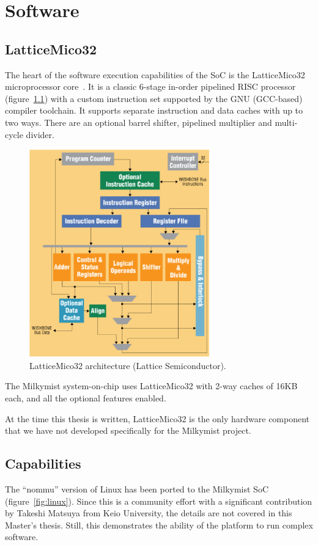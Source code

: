 \documentclass[a4paper,11pt]{kthesis}
\begin{document}
\chapter{Software}
\label{ch:sw}
\section{LatticeMico32}
\label{sec:mico32}
The heart of the software execution capabilities of the SoC is the LatticeMico32 microprocessor core~\cite{mico32}. It is a classic 6-stage in-order pipelined RISC processor (figure~\ref{fig:lm32arch}) with a custom instruction set supported by the GNU (GCC-based) compiler toolchain. It supports separate instruction and data caches with up to two ways. There are an optional barrel shifter, pipelined multiplier and multi-cycle divider.

\begin{figure}[htp]
\centering
\includegraphics[height=90mm]{lm32arch.eps}
\caption{LatticeMico32 architecture (Lattice Semiconductor).}
\label{fig:lm32arch}
\end{figure}

The Milkymist system-on-chip uses LatticeMico32 with 2-way caches of 16KB each, and all the optional features enabled.

At the time this thesis is written, LatticeMico32 is the only hardware component that we have not developed specifically for the Milkymist project.

\section{Capabilities}
The ``nommu'' version of Linux has been ported to the Milkymist SoC (figure~\ref{fig:linux}). Since this is a community effort with a significant contribution by Takeshi Matsuya from Keio University, the details are not covered in this Master's thesis. Still, this demonstrates the ability of the platform to run complex software.
\end{document}
